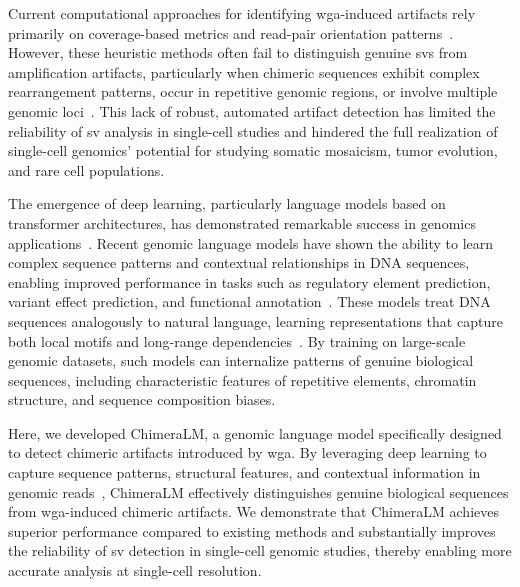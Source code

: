 \documentclass[pdflatex,sn-nature,lineno]{sn-jnl}%
\theoremstyle{thmstyleone}%
\theoremstyle{thmstyletwo}%
\theoremstyle{thmstylethree}%
\begin{document}
Current computational approaches for identifying \gls{wga}-induced artifacts rely primarily on coverage-based metrics and read-pair orientation patterns~\cite{kiguchi2021longread, lu2023exploration}.
However, these heuristic methods often fail to distinguish genuine \glspl{sv} from amplification artifacts, particularly when chimeric sequences exhibit complex rearrangement patterns, occur in repetitive genomic regions, or involve multiple genomic loci~\cite{kosugi2019comprehensive,mahmoud2019structural}.
This lack of robust, automated artifact detection has limited the reliability of \gls{sv} analysis in single-cell studies and hindered the full realization of single-cell genomics' potential for studying somatic mosaicism, tumor evolution, and rare cell populations.

The emergence of deep learning, particularly language models based on transformer architectures, has demonstrated remarkable success in genomics applications~\cite{dalla2025nucleotide,zhou2023dnabert,nguyen2023hyenadna, consens2023transformers}.
Recent genomic language models have shown the ability to learn complex sequence patterns and contextual relationships in DNA sequences, enabling improved performance in tasks such as regulatory element prediction, variant effect prediction, and functional annotation~\cite{consens2023transformers,routhier2022genomics}.
These models treat DNA sequences analogously to natural language, learning representations that capture both local motifs and long-range dependencies~\cite{dalla2025nucleotide}.
By training on large-scale genomic datasets, such models can internalize patterns of genuine biological sequences, including characteristic features of repetitive elements, chromatin structure, and sequence composition biases.

Here, we developed ChimeraLM, a genomic language model specifically designed to detect chimeric artifacts introduced by \gls{wga}.
By leveraging deep learning to capture sequence patterns, structural features, and contextual information in genomic reads~\cite{dalla2025nucleotide,zhou2023dnabert,nguyen2023hyenadna,consens2023transformers}, ChimeraLM effectively distinguishes genuine biological sequences from \gls{wga}-induced chimeric artifacts.
We demonstrate that ChimeraLM achieves superior performance compared to existing methods and substantially improves the reliability of \gls{sv} detection in single-cell genomic studies, thereby enabling more accurate analysis at single-cell resolution.
\end{document}
